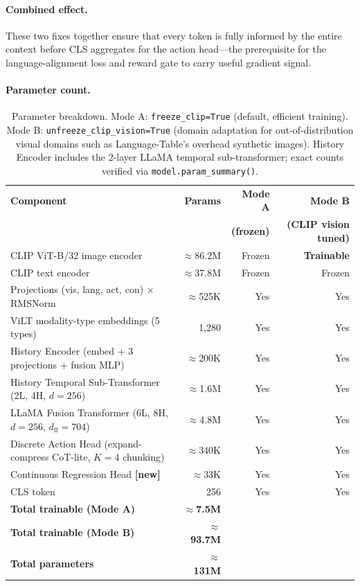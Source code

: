 \documentclass{article}
\newcommand{\NEW}{\textcolor{NewOrange}{\textbf{[new]}}\xspace}
\begin{document}
\paragraph{Combined effect.}
These two fixes together ensure that every token is fully informed by
the entire context before CLS aggregates for the action head---the
prerequisite for the language-alignment loss and reward gate to
carry useful gradient signal.

\paragraph{Parameter count.}
\begin{table}[h]
\centering
\caption{Parameter breakdown. Mode A: \texttt{freeze\_clip=True} (default, efficient training).
         Mode B: \texttt{unfreeze\_clip\_vision=True} (domain adaptation for out-of-distribution
         visual domains such as Language-Table's overhead synthetic images).
         History Encoder includes the 2-layer LLaMA temporal sub-transformer; exact counts
         verified via \texttt{model.param\_summary()}.}
\label{tab:params}
\small
\begin{tabular}{lrrr}
\toprule
\textbf{Component} & \textbf{Params} & \textbf{Mode A} & \textbf{Mode B} \\
                   &                 & \textbf{(frozen)} & \textbf{(CLIP vision tuned)} \\
\midrule
CLIP ViT-B/32 image encoder              & ${\approx}$86.2M & Frozen  & \textbf{Trainable} \\
CLIP text encoder                         & ${\approx}$37.8M & Frozen  & Frozen  \\
\midrule
Projections (vis, lang, act, con) $\times$RMSNorm & ${\approx}$525K & Yes & Yes \\
ViLT modality-type embeddings (5 types)  & 1,280            & Yes & Yes \\
History Encoder (embed + 3 projections + fusion MLP) & ${\approx}$200K & Yes & Yes \\
History Temporal Sub-Transformer (2L, 4H, $d{=}256$) & ${\approx}$1.6M & Yes & Yes \\
LLaMA Fusion Transformer (6L, 8H, $d{=}256$, $d_{\mathrm{ff}}{=}704$) & ${\approx}$4.8M & Yes & Yes \\
Discrete Action Head (expand-compress CoT-lite, $K{=}4$ chunking) & ${\approx}$340K  & Yes & Yes \\
Continuous Regression Head \NEW           & ${\approx}$33K   & Yes & Yes \\
CLS token                                 & 256              & Yes & Yes \\
\midrule
\textbf{Total trainable (Mode A)}        & ${\approx}$\textbf{7.5M}  & & \\
\textbf{Total trainable (Mode B)}        & ${\approx}$\textbf{93.7M} & & \\
\textbf{Total parameters}               & ${\approx}$\textbf{131M}  & & \\
\bottomrule
\end{tabular}
\end{table}
\end{document}
